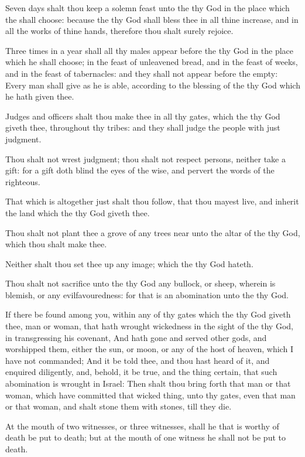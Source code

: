 \Verse Seven days shalt thou keep a solemn feast unto the \LORD thy God in the place which the \LORD shall choose: because the \LORD thy God shall bless thee in all thine increase, and in all the works of thine hands, therefore thou shalt surely rejoice.

\Verse Three times in a year shall all thy males appear before the \LORD thy God in the place which he shall choose; in the feast of unleavened bread, and in the feast of weeks, and in the feast of tabernacles: and they shall not appear before the \LORD empty: \Verse Every man shall give as he is able, according to the blessing of the \LORD thy God which he hath given thee.

\Verse Judges and officers shalt thou make thee in all thy gates, which the \LORD thy God giveth thee, throughout thy tribes: and they shall judge the people with just judgment.

\Verse Thou shalt not wrest judgment; thou shalt not respect persons, neither take a gift: for a gift doth blind the eyes of the wise, and pervert the words of the righteous.

\Verse That which is altogether just shalt thou follow, that thou mayest live, and inherit the land which the \LORD thy God giveth thee.

\Verse Thou shalt not plant thee a grove of any trees near unto the altar of the \LORD thy God, which thou shalt make thee.

\Verse Neither shalt thou set thee up any image; which the \LORD thy God hateth.


\Chapter
\Verse Thou shalt not sacrifice unto the \LORD thy God any bullock, or sheep, wherein is blemish, or any evilfavouredness: for that is an abomination unto the \LORD thy God.

\Verse If there be found among you, within any of thy gates which the \LORD thy God giveth thee, man or woman, that hath wrought wickedness in the sight of the \LORD thy God, in transgressing his covenant, \Verse And hath gone and served other gods, and worshipped them, either the sun, or moon, or any of the host of heaven, which I have not commanded; \Verse And it be told thee, and thou hast heard of it, and enquired diligently, and, behold, it be true, and the thing certain, that such abomination is wrought in Israel: \Verse Then shalt thou bring forth that man or that woman, which have committed that wicked thing, unto thy gates, even that man or that woman, and shalt stone them with stones, till they die.

\Verse At the mouth of two witnesses, or three witnesses, shall he that is worthy of death be put to death; but at the mouth of one witness he shall not be put to death.

